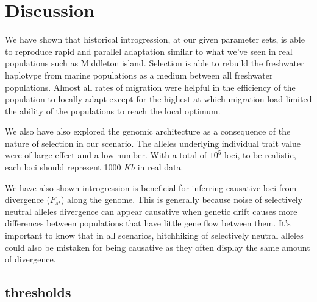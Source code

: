 \documentclass{article}
\begin{document}
\section*{Discussion}

We have shown that historical introgression, at our given parameter sets, is able to reproduce rapid and parallel adaptation similar to what we've seen in real populations such as Middleton island. Selection is able to rebuild the freshwater haplotype from marine populations as a medium between all freshwater populations. Almost all rates of migration were helpful in the efficiency of the population to locally adapt except for the highest at which migration load limited the ability of the populations to reach the local optimum. 

We also have also explored the genomic architecture as a consequence of the nature of selection in our scenario. The alleles underlying individual trait value were of large effect and a low number. With a total of $10^{5}$ loci, to be realistic, each loci should represent 1000 $Kb$ in real data.

We have also shown introgression is beneficial for inferring causative loci from divergence ($F_{st}$) along the genome. 
This is generally because noise of selectively neutral alleles divergence can appear causative when genetic drift causes more 
differences between populations that have little gene flow between them.
It's important to know that in all scenarios, hitchhiking of selectively neutral alleles could also be 
mistaken for being causative as they often display the same amount of divergence.




\subsection*{thresholds}
\end{document}
